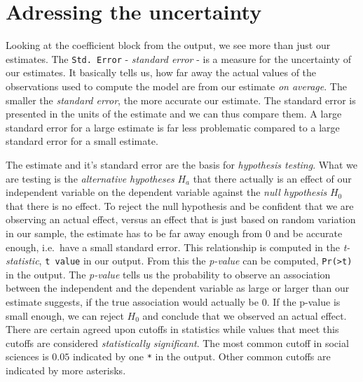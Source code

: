 \documentclass[
]{book}
\begin{document}
\hypertarget{adressing-the-uncertainty}{%
\section{Adressing the uncertainty}\label{adressing-the-uncertainty}}

Looking at the coefficient block from the output, we see more
than just our estimates. The \texttt{Std.\ Error} - \emph{standard error} - is a measure for the
uncertainty of our estimates. It basically tells us, how far away the actual
values of the observations used to compute the model are from our estimate
\emph{on average}. The smaller the \emph{standard error}, the more accurate our
estimate. The standard error is presented in the units of the estimate and we
can thus compare them. A large standard error for a large estimate is far less
problematic compared to a large standard error for a small estimate.

The estimate and it's standard error are the basis for \emph{hypothesis testing}.
What we are testing is the \emph{alternative hypotheses} \(H_a\) that there actually
is an effect of our independent variable on the dependent variable against the
\emph{null hypothesis} \(H_0\) that there is no effect. To reject the null hypothesis
and be confident that we are observing an actual effect, versus an effect that
is just based on random variation in our sample, the estimate has to be far
away enough from \(0\) and be accurate enough, i.e.~have a small standard error.
This relationship is computed in the \emph{t-statistic}, \texttt{t\ value} in
our output. From this the \emph{p-value} can be computed, \texttt{Pr(\textgreater{}\textbar{}t\textbar{})} in the output.
The \emph{p-value} tells us the probability to observe an association
between the independent and the dependent variable as large or larger than our
estimate suggests, if the true association would actually be \(0\). If the p-value
is small enough, we can reject \(H_0\) and conclude that we observed an actual
effect. There are certain agreed upon cutoffs in statistics while values that
meet this cutoffs are considered \emph{statistically significant}. The most common
cutoff in social sciences is \(0.05\) indicated by one \texttt{*} in the output.
Other common cutoffs are indicated by more asterisks.
\end{document}
